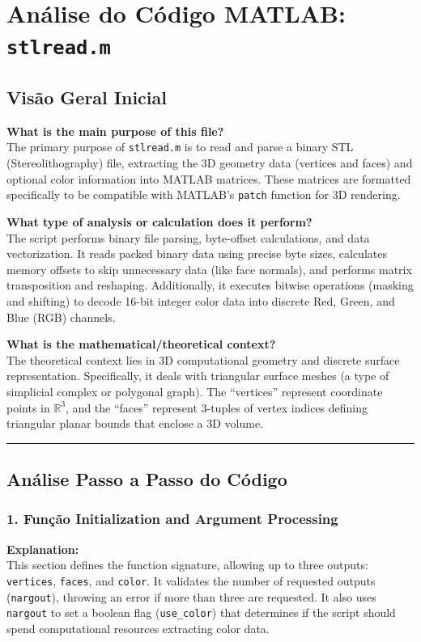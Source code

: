 
\chapter{Análise do Código MATLAB: \texttt{stlread.m}}
\section{Visão Geral Inicial}

\textbf{What is the main purpose of this file?} \\
The primary purpose of \texttt{stlread.m} is to read and parse a binary STL (Stereolithography) file, extracting the 3D geometry data (vertices and faces) and optional color information into MATLAB matrices. These matrices are formatted specifically to be compatible with MATLAB's \texttt{patch} function for 3D rendering.

\textbf{What type of analysis or calculation does it perform?} \\
The script performs binary file parsing, byte-offset calculations, and data vectorization. It reads packed binary data using precise byte sizes, calculates memory offsets to skip unnecessary data (like face normals), and performs matrix transposition and reshaping. Additionally, it executes bitwise operations (masking and shifting) to decode 16-bit integer color data into discrete Red, Green, and Blue (RGB) channels.

\textbf{What is the mathematical/theoretical context?} \\
The theoretical context lies in 3D computational geometry and discrete surface representation. Specifically, it deals with triangular surface meshes (a type of simplicial complex or polygonal graph). The ``vertices'' represent coordinate points in $\mathbb{R}^3$, and the ``faces'' represent 3-tuples of vertex indices defining triangular planar bounds that enclose a 3D volume. 

\vspace{0.5cm}
\hrule
\vspace{0.5cm}

\section{Análise Passo a Passo do Código}

\subsection{1. Função Initialization and Argument Processing}
\textbf{Explanation:} \\
This section defines the function signature, allowing up to three outputs: \texttt{vertices}, \texttt{faces}, and \texttt{color}. It validates the number of requested outputs (\texttt{nargout}), throwing an error if more than three are requested. It also uses \texttt{nargout} to set a boolean flag (\texttt{use\_color}) that determines if the script should spend computational resources extracting color data.

